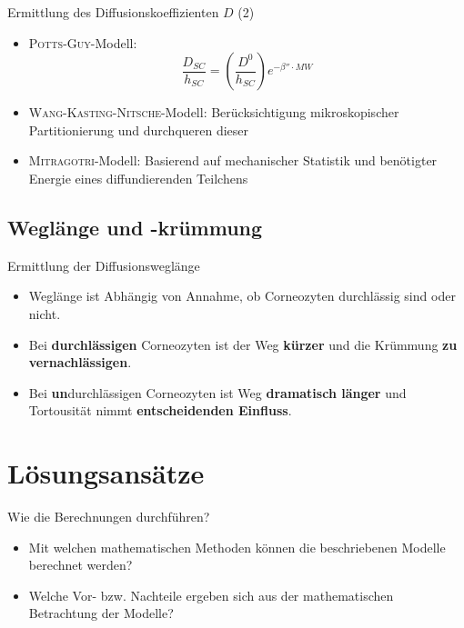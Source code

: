 \documentclass[utf8x,compress,professionalfonts]{beamer}
\begin{document}
\begin{frame}{Ermittlung des Diffusionskoeffizienten $D$ (2)}
  \begin{itemize}
    \item<1-> \textsc{Potts}-\textsc{Guy}-Modell:
      \scriptsize
      \begin{equation}
        \frac{D_{SC}}{h_{SC}} = \left( \frac{D^0}{h_{SC}}\right) e^{-\beta''\cdot MW}
      \end{equation}
      \normalsize
    \item<2-> \textsc{Wang}-\textsc{Kasting}-\textsc{Nitsche}-Modell:
      Ber\"ucksichtigung mikroskopischer Partitionierung und durchqueren dieser
      \bigskip
    \item<3-> \textsc{Mitragotri}-Modell: Basierend auf mechanischer Statistik und
      ben\"otigter Energie eines diffundierenden Teilchens
  \end{itemize}
\end{frame}


\subsection{Wegl\"ange und -kr\"ummung}
\begin{frame}{Ermittlung der Diffusionswegl\"ange}
  \begin{itemize}
    \item<1-> Wegl\"ange ist Abh\"angig von Annahme, ob Corneozyten durchl\"assig sind
      oder nicht.
      \bigskip
    \item<2-> Bei \textbf{durchl\"assigen} Corneozyten ist der Weg \textbf{k\"urzer}
      und die Kr\"ummung \textbf{zu vernachl\"assigen}.
      \bigskip
    \item<3-> Bei \textbf{un}durchl\"assigen Corneozyten ist Weg \textbf{dramatisch l\"anger}
      und Tortousit\"at nimmt \textbf{entscheidenden Einfluss}.
  \end{itemize}
\end{frame}


\section{L\"osungsans\"atze}
\begin{frame}{Wie die Berechnungen durchf\"uhren?}
  \begin{itemize}
    \item<1-> Mit welchen mathematischen Methoden k\"onnen die beschriebenen Modelle
      berechnet werden?
      \bigskip
    \item<2-> Welche Vor- bzw. Nachteile ergeben sich aus der mathematischen Betrachtung
      der Modelle?
      \bigskip
  \end{itemize}
\end{frame}
\end{document}
